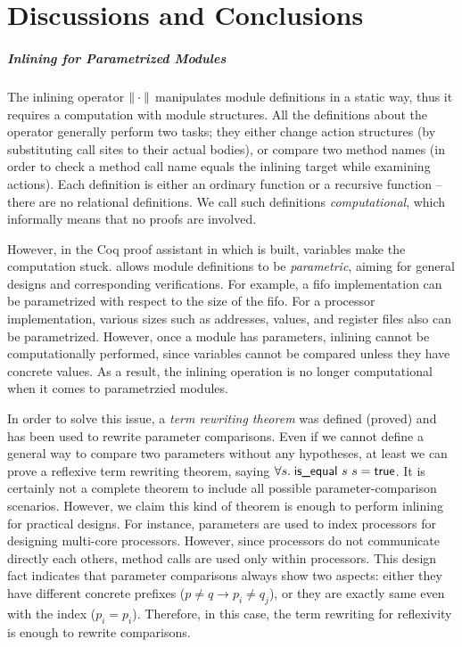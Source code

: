 \chapter{Discussions and Conclusions}
\label{chap:conclusions}

\paragraph{Inlining for Parametrized Modules}

The inlining operator $\| \cdot \|$ manipulates module definitions
in a static way, thus it requires a computation with module
structures. All the definitions about the operator generally perform
two tasks; they either change action structures (by substituting call
sites to their actual bodies), or compare two method names (in order
to check a method call name equals the inlining target while examining
actions). Each definition is either an ordinary function or a
recursive function -- there are no relational definitions. We call
such definitions \emph{computational}, which informally means that no
proofs are involved.

However, in the Coq proof assistant in which \Kami{} is built,
variables make the computation stuck. \Kami{} allows module
definitions to be \emph{parametric}, aiming for general designs and
corresponding verifications. For example, a fifo implementation can be
parametrized with respect to the size of the fifo. For a processor
implementation, various sizes such as addresses, values, and register
files also can be parametrized.  However, once a module has
parameters, inlining cannot be computationally performed, since
variables cannot be compared unless they have concrete values. As a
result, the inlining operation is no longer computational when it
comes to parametrzied modules.

In order to solve this issue, a \emph{term rewriting theorem} was
defined (proved) and has been used to rewrite parameter
comparisons. Even if we cannot define a general way to compare two
parameters without any hypotheses, at least we can prove a reflexive
term rewriting theorem, saying $\forall s.\; \textsf{is\_equal}\ s\ s
= \textsf{true}$. It is certainly not a complete theorem to include all
possible parameter-comparison scenarios. However, we claim this kind
of theorem is enough to perform inlining for practical designs. For
instance, parameters are used to index processors for designing
multi-core processors. However, since processors do not communicate
directly each others, method calls are used only within
processors. This design fact indicates that parameter comparisons
always show two aspects: either they have different concrete prefixes
($p \neq q \to p_i \neq q_j$), or they are exactly same even with the
index ($p_i = p_i$). Therefore, in this case, the term rewriting for
reflexivity is enough to rewrite comparisons.

